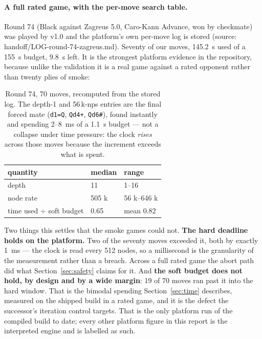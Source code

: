 \documentclass[11pt,a4paper]{article}
\newcommand{\src}[1]{{\small(source: #1)}}
\newcommand{\code}[1]{\texttt{#1}}
\begin{document}
\paragraph{A full rated game, with the per-move search table.} Round 74 (Black against Zagreus 5.0,
Caro-Kann Advance, won by checkmate) was played by v1.0 and the platform's own per-move log is stored
\src{handoff/LOG-round-74-zagreus.md}. Seventy of our moves, 145.2~s used of a 155~s budget, 9.8~s left.
It is the strongest platform evidence in the repository, because unlike the validation it is a real game
against a rated opponent rather than twenty plies of smoke:

\begin{table}[H]\centering\small
\begin{tabular}{@{}lll@{}}
\toprule
quantity & median & range \\
\midrule
depth & 11 & 1--16 \\
node rate & 505 k & 56 k--646 k \\
time used $\div$ soft budget & 0.65 & mean 0.82 \\
\bottomrule
\end{tabular}
\caption{Round 74, 70 moves, recomputed from the stored log. The depth-1 and 56\,k-nps entries are the
final forced mate (\code{d1=Q}, \code{Qd4+}, \code{Qd6\#}), found instantly and spending 2--8~ms of a
1.1~s budget --- not a collapse under time pressure: the clock \emph{rises} across those moves because
the increment exceeds what is spent.}
\end{table}

Two things this settles that the smoke games could not. \textbf{The hard deadline holds on the platform.} Two
of the seventy moves exceeded it, both by exactly 1~ms --- the clock is read every 512 nodes, so a
millisecond is the granularity of the measurement rather than a breach. Across a full rated game the
abort path did what Section~\ref{sec:safety} claims for it. And \textbf{the soft budget does not hold, by
design and by a wide margin}: 19 of 70 moves ran past it into the hard window. That is the bimodal
spending Section~\ref{sec:time} describes, measured on the shipped build in a rated game, and it is the
defect the successor's iteration control targets. That is the only platform run of the compiled build to
date; every other platform figure in this report is the interpreted engine and is labelled as such.
\end{document}
